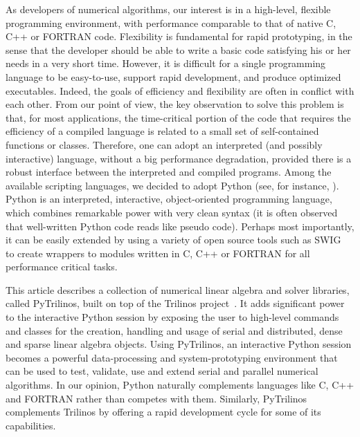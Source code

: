 \documentclass[acmtocl]{acmtrans2m}
\newcommand{\PyTrilinos}{{PyTrilinos}}
\begin{document}
As developers of numerical algorithms, our interest is in a
high-level, flexible programming environment, with performance
comparable to that of native C, C++ or FORTRAN code. Flexibility is
fundamental for rapid prototyping, in the sense that the developer
should be able to write a basic code satisfying his or her needs in a
very short time.  However, it is difficult for a single programming
language to be easy-to-use, support rapid development, and produce
optimized executables. Indeed, the goals of efficiency and flexibility
are often in conflict with each other. From our point of view, the key
observation to solve this problem is that, for most applications, the
time-critical portion of the code that requires the efficiency of a
compiled language is related to a small set of self-contained
functions or classes. Therefore, one can adopt an interpreted (and
possibly interactive) language, without a big performance degradation,
provided there is a robust interface between the interpreted and
compiled programs. Among the available scripting languages, we
decided to adopt Python (see, for instance, \cite{python-book}).
Python is an interpreted, interactive, object-oriented programming
language, which combines remarkable power with very clean syntax (it
is often observed that well-written Python code reads like pseudo
code).  Perhaps most importantly, it can be easily extended by using a
variety of open source tools such as SWIG~\cite{swig} to create
wrappers to modules written in C, C++ or FORTRAN for all performance
critical tasks.

This article describes a collection of numerical linear algebra and
solver libraries, called PyTrilinos, built on top of the Trilinos
project~\cite{Trilinos-home-page,Heroux:2005:OTP}.  It adds
significant power to the interactive Python session by exposing the
user to high-level commands and classes for the creation, handling and
usage of serial and distributed, dense and sparse linear algebra
objects. Using \PyTrilinos, an interactive Python session becomes a
powerful data-processing and system-prototyping environment that can
be used to test, validate, use and extend serial and parallel
numerical algorithms. In our opinion, Python naturally complements
languages like C, C++ and FORTRAN rather than competes with them.
Similarly, PyTrilinos complements Trilinos by offering a rapid
development cycle for some of its capabilities.

\end{document}
